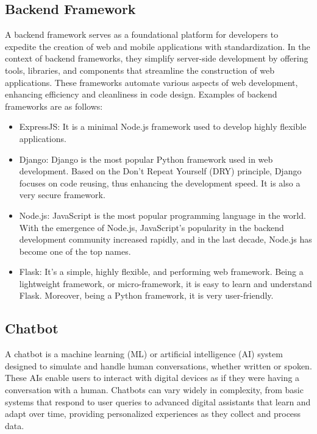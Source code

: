 \documentclass[12pt,oneside,openright,a4paper]{cpe-english-project}
\begin{document}
    \subsection{Backend Framework}
      \qquad A backend framework serves as a foundational platform for developers to expedite the creation of web and mobile applications with standardization. In the context of backend frameworks, they simplify server-side development by offering tools, libraries, and components that streamline the construction of web applications. These frameworks automate various aspects of web development, enhancing efficiency and cleanliness in code design. Examples of backend frameworks are as follows:\par
      \begin{itemize}
        \item ExpressJS: It is a minimal Node.js framework used to develop highly flexible applications.
        \item Django: Django is the most popular Python framework used in web development. Based on the Don’t Repeat Yourself (DRY) principle, Django focuses on code reusing, thus enhancing the development speed. It is also a very secure framework.
        \item Node.js: JavaScript is the most popular programming language in the world. With the emergence of Node.js, JavaScript’s popularity in the backend development community increased rapidly, and in the last decade, Node.js has become one of the top names.
        \item Flask: It’s a simple, highly flexible, and performing web framework. Being a lightweight framework, or micro-framework, it is easy to learn and understand Flask. Moreover, being a Python framework, it is very user-friendly.
      \end{itemize}
    
    \subsection{Chatbot}
      \qquad A chatbot is a machine learning (ML) or artificial intelligence (AI) system designed to simulate and handle human conversations, whether written or spoken. These AIs enable users to interact with digital devices as if they were having a conversation with a human. Chatbots can vary widely in complexity, from basic systems that respond to user queries to advanced digital assistants that learn and adapt over time, providing personalized experiences as they collect and process data.\par
\end{document}
